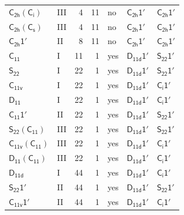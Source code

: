 \documentclass[10pt,a4paper]{article}
\numberwithin{equation}{section}
\newcommand{\grp}[1]{\mathsf{#1}}
\begin{document}
{\begin{longtable}{@{}llrrlll@{}}
\href{C2h-S2.pdf}{$\grp{C_{2h}}(\grp{C_{i}})$} & III & 4 & 11 & no & \href{C2h-1p.pdf}{$\grp{C_{2h}1'}$} & \href{C2h-1p.pdf}{$\grp{C_{2h}1'}$}\\
\href{C2h-C1v.pdf}{$\grp{C_{2h}}(\grp{C_{s}})$} & III & 4 & 11 & no & \href{C2h-1p.pdf}{$\grp{C_{2h}1'}$} & \href{C2h-1p.pdf}{$\grp{C_{2h}1'}$}\\
\href{C2h-1p.pdf}{$\grp{C_{2h}1'}$} & II & 8 & 11 & no & \href{C2h-1p.pdf}{$\grp{C_{2h}1'}$} & \href{C2h-1p.pdf}{$\grp{C_{2h}1'}$}\\
\href{../../../rotation/data/pdf/C11.pdf}{$\grp{C_{11}}$} & I & 11 & 1 & yes & \href{D11d-1p.pdf}{$\grp{D_{11d}1'}$} & \href{S22-1p.pdf}{$\grp{S_{22}1'}$}\\
\href{../../../rotation/data/pdf/S22.pdf}{$\grp{S_{22}}$} & I & 22 & 1 & yes & \href{D11d-1p.pdf}{$\grp{D_{11d}1'}$} & \href{S22-1p.pdf}{$\grp{S_{22}1'}$}\\
\href{../../../rotation/data/pdf/C11v.pdf}{$\grp{C_{11v}}$} & I & 22 & 1 & yes & \href{D11d-1p.pdf}{$\grp{D_{11d}1'}$} & \href{S2-1p.pdf}{$\grp{C_{i}1'}$}\\
\href{../../../rotation/data/pdf/D11.pdf}{$\grp{D_{11}}$} & I & 22 & 1 & yes & \href{D11d-1p.pdf}{$\grp{D_{11d}1'}$} & \href{S2-1p.pdf}{$\grp{C_{i}1'}$}\\
\href{C11-1p.pdf}{$\grp{C_{11}1'}$} & II & 22 & 1 & yes & \href{D11d-1p.pdf}{$\grp{D_{11d}1'}$} & \href{S22-1p.pdf}{$\grp{S_{22}1'}$}\\
\href{S22-C11.pdf}{$\grp{S_{22}}(\grp{C_{11}})$} & III & 22 & 1 & yes & \href{D11d-1p.pdf}{$\grp{D_{11d}1'}$} & \href{S22-1p.pdf}{$\grp{S_{22}1'}$}\\
\href{C11v-C11.pdf}{$\grp{C_{11v}}(\grp{C_{11}})$} & III & 22 & 1 & yes & \href{D11d-1p.pdf}{$\grp{D_{11d}1'}$} & \href{S2-1p.pdf}{$\grp{C_{i}1'}$}\\
\href{D11-C11.pdf}{$\grp{D_{11}}(\grp{C_{11}})$} & III & 22 & 1 & yes & \href{D11d-1p.pdf}{$\grp{D_{11d}1'}$} & \href{S2-1p.pdf}{$\grp{C_{i}1'}$}\\
\href{../../../rotation/data/pdf/D11d.pdf}{$\grp{D_{11d}}$} & I & 44 & 1 & yes & \href{D11d-1p.pdf}{$\grp{D_{11d}1'}$} & \href{S2-1p.pdf}{$\grp{C_{i}1'}$}\\
\href{S22-1p.pdf}{$\grp{S_{22}1'}$} & II & 44 & 1 & yes & \href{D11d-1p.pdf}{$\grp{D_{11d}1'}$} & \href{S22-1p.pdf}{$\grp{S_{22}1'}$}\\
\href{C11v-1p.pdf}{$\grp{C_{11v}1'}$} & II & 44 & 1 & yes & \href{D11d-1p.pdf}{$\grp{D_{11d}1'}$} & \href{S2-1p.pdf}{$\grp{C_{i}1'}$}\\

\end{longtable}}
\end{document}
